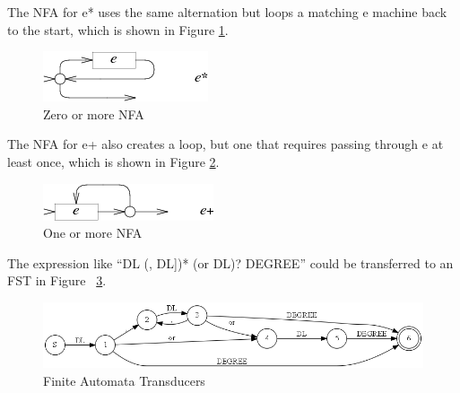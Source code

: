 The NFA for e* uses the same alternation but loops a matching e machine back to the start, which is shown in Figure \ref{fig:nfa_star}.

\begin{figure}[htbp]
  \centering
  \includegraphics[scale=1]{images/star.png}
  \caption{Zero or more NFA}
  \label{fig:nfa_star}
\end{figure}

The NFA for e+ also creates a loop, but one that requires passing through e at least once, which is shown in Figure \ref{fig:nfa_plus}.

\begin{figure}[htbp]
  \centering
  \includegraphics[scale=1]{images/plus.png}
  \caption{One or more NFA}
  \label{fig:nfa_plus}
\end{figure}



The expression like ``DL (, DL])*  (or DL)? DEGREE'' could be transferred to an FST in Figure ~\ref{fig:fst}.

\begin{figure}[htbp]
  \centering
  \includegraphics[scale=0.6]{images/test_tokenre2_6.png}
  \caption{Finite Automata Transducers}
  \label{fig:fst}
\end{figure}


